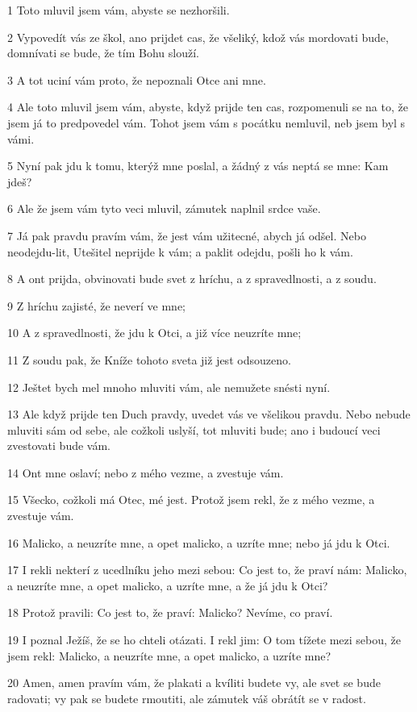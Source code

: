 \par 1 Toto mluvil jsem vám, abyste se nezhoršili.
\par 2 Vypovedít vás ze škol, ano prijdet cas, že všeliký, kdož vás mordovati bude, domnívati se bude, že tím Bohu slouží.
\par 3 A tot uciní vám proto, že nepoznali Otce ani mne.
\par 4 Ale toto mluvil jsem vám, abyste, když prijde ten cas, rozpomenuli se na to, že jsem já to predpovedel vám. Tohot jsem vám s pocátku nemluvil, neb jsem byl s vámi.
\par 5 Nyní pak jdu k tomu, kterýž mne poslal, a žádný z vás neptá se mne: Kam jdeš?
\par 6 Ale že jsem vám tyto veci mluvil, zámutek naplnil srdce vaše.
\par 7 Já pak pravdu pravím vám, že jest vám užitecné, abych já odšel. Nebo neodejdu-lit, Utešitel neprijde k vám; a paklit odejdu, pošli ho k vám.
\par 8 A ont prijda, obvinovati bude svet z hríchu, a z spravedlnosti, a z soudu.
\par 9 Z hríchu zajisté, že neverí ve mne;
\par 10 A z spravedlnosti, že jdu k Otci, a již více neuzríte mne;
\par 11 Z soudu pak, že Kníže tohoto sveta již jest odsouzeno.
\par 12 Ještet bych mel mnoho mluviti vám, ale nemužete snésti nyní.
\par 13 Ale když prijde ten Duch pravdy, uvedet vás ve všelikou pravdu. Nebo nebude mluviti sám od sebe, ale cožkoli uslyší, tot mluviti bude; ano i budoucí veci zvestovati bude vám.
\par 14 Ont mne oslaví; nebo z mého vezme, a zvestuje vám.
\par 15 Všecko, cožkoli má Otec, mé jest. Protož jsem rekl, že z mého vezme, a zvestuje vám.
\par 16 Malicko, a neuzríte mne, a opet malicko, a uzríte mne; nebo já jdu k Otci.
\par 17 I rekli nekterí z ucedlníku jeho mezi sebou: Co jest to, že praví nám: Malicko, a neuzríte mne, a opet malicko, a uzríte mne, a že já jdu k Otci?
\par 18 Protož pravili: Co jest to, že praví: Malicko? Nevíme, co praví.
\par 19 I poznal Ježíš, že se ho chteli otázati. I rekl jim: O tom tížete mezi sebou, že jsem rekl: Malicko, a neuzríte mne, a opet malicko, a uzríte mne?
\par 20 Amen, amen pravím vám, že plakati a kvíliti budete vy, ale svet se bude radovati; vy pak se budete rmoutiti, ale zámutek váš obrátít se v radost.
